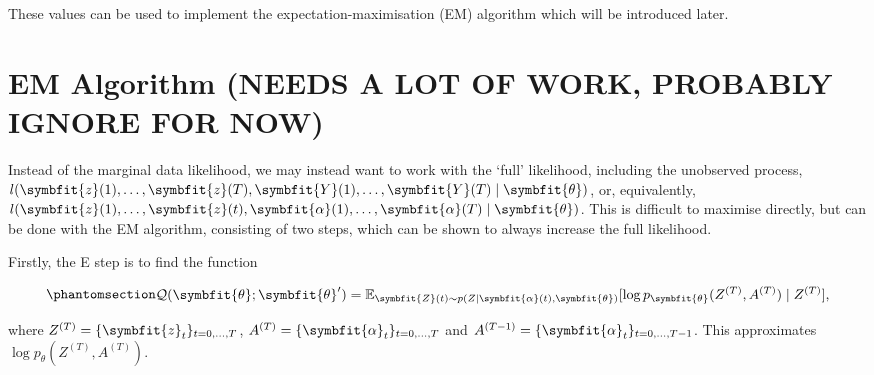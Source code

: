 \documentclass[
]{report}
\newcommand{\bv}[1]{\symbfit{#1}}
\theoremstyle{plain}
\theoremstyle{plain}
\theoremstyle{plain}
\theoremstyle{remark}
\begin{document}
These values can be used to implement the expectation-maximisation (EM)
algorithm which will be introduced later.

\chapter{EM Algorithm (NEEDS A LOT OF WORK, PROBABLY IGNORE FOR
NOW)}\label{em-algorithm-needs-a-lot-of-work-probably-ignore-for-now}

Instead of the marginal data likelihood, we may instead want to work
with the `full' likelihood, including the unobserved process,
\(l(\bv z(1),\dots, \bv z(T), \bv Y(1), \dots, \bv Y(T)\mid \bv\theta)\),
or, equivalently,
\(l(\bv z(1),\dots, \bv z(t), \bv \alpha(1), \dots, \bv\alpha(T)\mid \bv\theta)\).
This is difficult to maximise directly, but can be done with the EM
algorithm, consisting of two steps, which can be shown to always
increase the full likelihood.

Firstly, the E step is to find the function

\begin{equation}\phantomsection\label{eq-Qdef}{\begin{split}
\mathcal Q(\bv \theta; \bv \theta') = \mathbb E_{\bv Z(t)\sim p(Z \mid \bv\alpha(t),\bv\theta)}[\log p_{\bv\theta}(Z^{(T)}, A^{(T)})\mid Z^{(T)}],
\end{split}
}\end{equation}

where \(Z^{(T)} = \{\bv z_t\}_{t=0,\dots,T}\),
\(A^{(T)} = \{\bv \alpha_t\}_{t=0,\dots,T}\) and
\(A^{(T-1)} = \{\bv \alpha_t\}_{t=0,\dots,T-1}\). This approximates
\(\log p_\theta(Z^{(T)}, A^{(T)})\).
\end{document}

